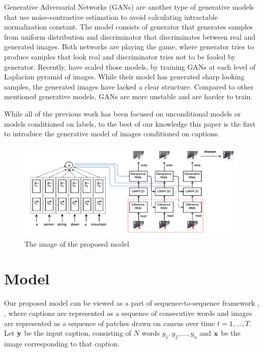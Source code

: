 \documentclass{article} %
\newcommand{\icaption}{{\bf{y}}}
\newcommand{\oimage}{{\bf{x}}}
\begin{document}
Generative Adversarial Networks (GANs) \citep{goodfellow_gan} are another type of generative models that use noise-contrastive estimation \citep{gutmann_nce} to avoid calculating intractable normalization constant. The model consists of generator that generates samples from uniform distribution and discriminator that discriminates between real and generated images. Both networks are playing the game, where generator tries to produce samples that look real and discriminator tries not to be fooled by generator. Recently, \cite{denton_lapgan} have scaled those models, by training GANs at each level of Laplacian pyramid of images. While their model has generated sharp looking samples, the generated images have lacked a clear structure. Compared to other mentioned generative models, GANs are more unstable and are harder to train.

While all of the previous work has been focused on unconditional models or models conditioned on labels, to the best of our knowledge this paper is the first to introduce the generative model of images conditioned on captions.

\begin{figure}[!t]
\captionsetup[subfigure]{labelformat=empty}
\begin{center}
\includegraphics[width=0.99\textwidth]{figures/alignDraw-cropped.pdf}\quad
%
\end{center}
\caption{The image of the proposed model}
\label{fig:figmodel}
\vspace{-0.3cm}
\end{figure}

\section{Model}
Our proposed model can be viewed as a part of sequence-to-sequence framework \citep{ilya_mt}, \citep{cho_mt}, \citep{nitish_video} where captions are represented as a sequence of consecutive words and images are represented as a sequence of patches drawn on canvas over time $t=1,...,T$. Let $\icaption$ be the input caption, consisting of $N$ words $y_{1}, y_{2}, ..., y_{n}$ and $\oimage$ be the image corresponding to that caption.
\end{document}
